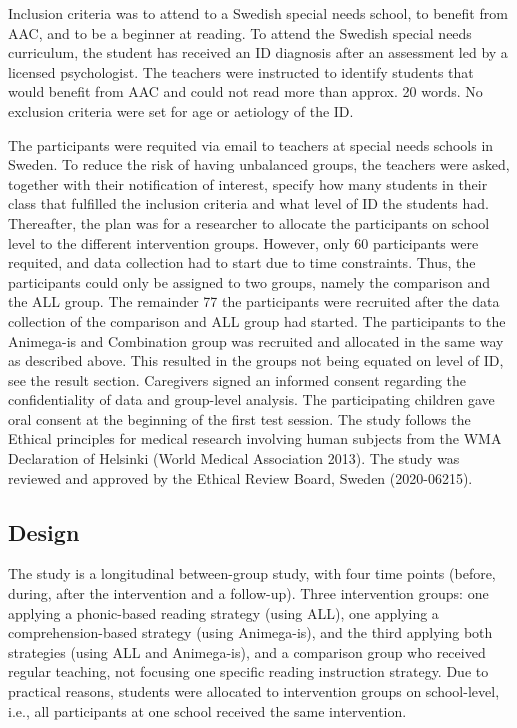 \documentclass[
  ,
]{article}
\begin{document}
Inclusion criteria was to attend to a Swedish special needs school, to
benefit from AAC, and to be a beginner at reading. To attend the Swedish
special needs curriculum, the student has received an ID diagnosis after
an assessment led by a licensed psychologist. The teachers were
instructed to identify students that would benefit from AAC and could
not read more than approx. 20 words. No exclusion criteria were set for
age or aetiology of the ID.

The participants were requited via email to teachers at special needs
schools in Sweden. To reduce the risk of having unbalanced groups, the
teachers were asked, together with their notification of interest,
specify how many students in their class that fulfilled the inclusion
criteria and what level of ID the students had. Thereafter, the plan was
for a researcher to allocate the participants on school level to the
different intervention groups. However, only 60 participants were
requited, and data collection had to start due to time constraints.
Thus, the participants could only be assigned to two groups, namely the
comparison and the ALL group. The remainder 77 the participants were
recruited after the data collection of the comparison and ALL group had
started. The participants to the Animega-is and Combination group was
recruited and allocated in the same way as described above. This
resulted in the groups not being equated on level of ID, see the result
section. Caregivers signed an informed consent regarding the
confidentiality of data and group-level analysis. The participating
children gave oral consent at the beginning of the first test session.
The study follows the Ethical principles for medical research involving
human subjects from the WMA Declaration of Helsinki (World Medical
Association 2013). The study was reviewed and approved by the Ethical
Review Board, Sweden (2020-06215).

\hypertarget{design}{%
\subsection{Design}\label{design}}

The study is a longitudinal between-group study, with four time points
(before, during, after the intervention and a follow-up). Three
intervention groups: one applying a phonic-based reading strategy (using
ALL), one applying a comprehension-based strategy (using Animega-is),
and the third applying both strategies (using ALL and Animega-is), and a
comparison group who received regular teaching, not focusing one
specific reading instruction strategy. Due to practical reasons,
students were allocated to intervention groups on school-level, i.e.,
all participants at one school received the same intervention.
\end{document}
